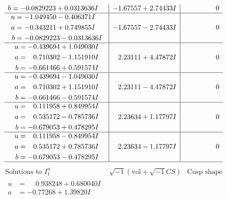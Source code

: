 \documentclass[1p]{elsarticle_modified}
\theoremstyle{definition}
\newcommand{\I}{\sqrt{-1}}
\begin{document}
$$\begin{array}{c|c|c}
\begin{aligned}
b &= -0.0829223 + 0.0313636 I\end{aligned}
 & -1.67557 + 2.74433 I & \phantom{-0.000000 } 0 \\ \hline\begin{aligned}
u &= -1.049450 - 0.406371 I \\
a &= -0.343211 + 0.749855 I \\
b &= -0.0829223 - 0.0313636 I\end{aligned}
 & -1.67557 - 2.74433 I & \phantom{-0.000000 } 0 \\ \hline\begin{aligned}
u &= -0.439694 + 1.049030 I \\
a &= \phantom{-}0.710302 - 1.151910 I \\
b &= -0.661466 + 0.591574 I\end{aligned}
 & \phantom{-}2.23111 + 4.47872 I & \phantom{-0.000000 } 0 \\ \hline\begin{aligned}
u &= -0.439694 - 1.049030 I \\
a &= \phantom{-}0.710302 + 1.151910 I \\
b &= -0.661466 - 0.591574 I\end{aligned}
 & \phantom{-}2.23111 - 4.47872 I & \phantom{-0.000000 } 0 \\ \hline\begin{aligned}
u &= \phantom{-}0.111958 + 0.849954 I \\
a &= \phantom{-}0.535172 - 0.785736 I \\
b &= -0.679053 + 0.478295 I\end{aligned}
 & \phantom{-}2.23634 + 1.17797 I & \phantom{-0.000000 } 0 \\ \hline\begin{aligned}
u &= \phantom{-}0.111958 - 0.849954 I \\
a &= \phantom{-}0.535172 + 0.785736 I \\
b &= -0.679053 - 0.478295 I\end{aligned}
 & \phantom{-}2.23634 - 1.17797 I & \phantom{-0.000000 } 0\\
 \hline 
 \end{array}$$\newpage$$\begin{array}{c|c|c}  
\text{Solutions to }I^u_{1}& \I (\text{vol} + \sqrt{-1}CS) & \text{Cusp shape}\\
 \hline 
\begin{aligned}
u &= \phantom{-}0.938248 + 0.680040 I \\
a &= -0.77268 + 1.39820 I \\

\end{aligned}
\end{array}$$
\end{document}

